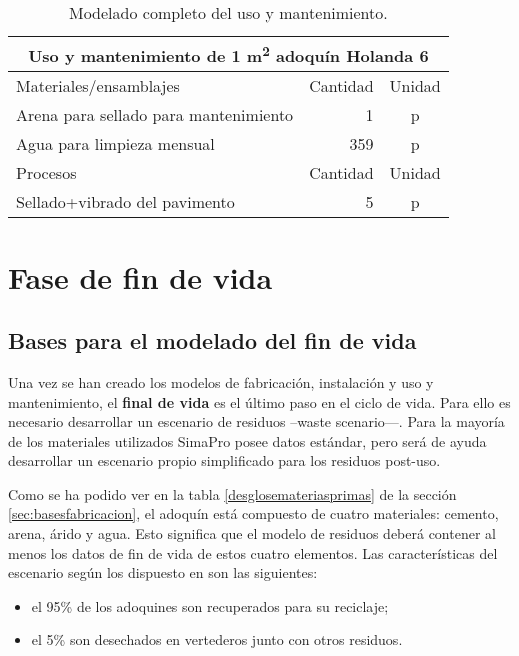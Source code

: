 \begin{table}[!htb]
\centering
\begin{tabular}{p{8cm}rc}
\toprule
\multicolumn{3}{c}{Uso y mantenimiento de 1 \si{m^2} adoquín Holanda 6}\\
\midrule
Materiales/ensamblajes & Cantidad & Unidad\\
\midrule
Arena para sellado para mantenimiento & 1 & p\\
Agua para limpieza mensual & 359 & p\\
\midrule
Procesos & Cantidad & Unidad\\
\midrule
Sellado+vibrado del pavimento & 5 & p\\
\bottomrule
\end{tabular}
\caption{Modelado completo del uso y mantenimiento.}
\label{modeladocompletousoymantenimiento}
\end{table}

\section{Fase de fin de vida}\label{sec:fasefindevida}

\subsection{Bases para el modelado del fin de vida}
Una vez se han creado los modelos de fabricación, instalación y uso y mantenimiento, el \textbf{final de vida} es el último paso en el ciclo de vida. Para ello es necesario desarrollar un escenario de residuos –waste scenario—. Para la mayoría de los materiales utilizados SimaPro posee datos estándar, pero será de ayuda desarrollar un escenario propio simplificado para los residuos post-uso.

Como se ha podido ver en la tabla \ref{desglosemateriasprimas} de la sección \ref{sec:basesfabricacion}, el adoquín está compuesto de cuatro materiales: cemento, arena, árido y agua. Esto significa que el modelo de residuos deberá contener al menos los datos de fin de vida de estos cuatro elementos. Las características del escenario según los dispuesto en \cite{euroadoquin} son las siguientes:
\begin{itemize}
  \item el 95\% de los adoquines son recuperados para su reciclaje;
  \item el 5\% son desechados en vertederos junto con otros residuos.
\end{itemize}

